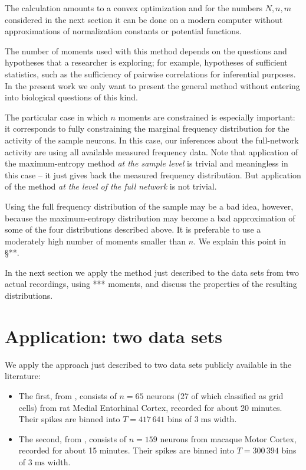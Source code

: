 \documentclass[\ifafour a4paper,12pt,\else a5paper,10pt,\fi%
onecolumn,oneside,article,%
british%
]{memoir}
\theoremstyle{remark}
\theoremstyle{innote}
\newcommand*{\citep}{\parencites}
\renewcommand*{\|}{\nonscript\,\vert\nonscript\;\mathopen{}}
\newcommand*{\sect}{\S}%
\newcommand*{\chap}{ch.}%
\begin{document}
The calculation amounts to a convex optimization
\citep{meadetal1984}[\chap~10]{pressetal1988_r2007}{fangetal1997,boydetal2004_r2009,portamana2017b}
and for the numbers $N,n,m$ considered in the next section it can be done
on a modern computer without approximations of normalization constants or
potential functions.

\bigskip

The number of moments used with this method depends on the questions and
hypotheses that a researcher is exploring; for example, hypotheses of
sufficient statistics, such as the sufficiency of pairwise correlations for
inferential purposes. In the present work we only want to present the
general method without entering into biological questions of this kind.

The particular case in which $n$ moments are constrained is especially
important: it corresponds to fully constraining the marginal frequency
distribution for the activity of the sample neurons. In this case, our
inferences about the full-network activity are using all available measured
frequency data. Note that application of the maximum-entropy method
\emph{at the sample level} is trivial and meaningless in this case -- it
just gives back the measured frequency distribution. But application of the
method \emph{at the level of the full network} is not trivial.

Using the full frequency distribution of the sample may be a bad idea,
however, because the maximum-entropy distribution may become a bad
approximation of some of the four distributions described above. It is
preferable to use a moderately high number of moments smaller than $n$. We
explain this point in \sect***.

\bigskip

In the next section we apply the method just described to the data sets
from two actual recordings, using *** moments, and discuss the properties
of the resulting distributions.

\section{Application: two data sets}
\label{sec:application}

We apply the approach just described to two data sets publicly available in
the literature:
\begin{itemize}[wide]
\item The first, from \textcite[rat 14147]{stensolaetal2012},
  consists of $n=65$ neurons (27 of which classified as grid cells) from
  rat Medial Entorhinal Cortex, recorded for about 20 minutes. Their spikes
  are binned into $T=417\,641$ bins of $3\;\textrm{ms}$ width.
\item The second, from
  \textcite{rostamietal2016_r2017}, %
  consists of $n=159$ neurons from macaque Motor Cortex, recorded for about
  15 minutes. Their spikes are binned into $T=300\,394$ bins of
  $3\;\textrm{ms}$ width.
\end{itemize}
\end{document}
